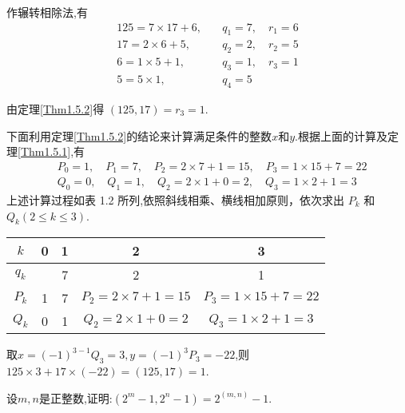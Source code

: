 \proof 作辗转相除法,有
\begin{equation*}
	\begin{aligned}
		125=7 \times 17+6, \quad& q_{1}=7, \quad r_{1}=6 \\
		17=2 \times 6+5, \quad& q_{2}=2, \quad r_{2}=5 \\
		6=1 \times 5+1, \quad& q_{3}=1, \quad r_{3}=1 \\
		5=5 \times 1, \quad&q_{4}=5
	\end{aligned}
\end{equation*}

由定理\ref{Thm1.5.2}得 $(125,17)=r_{3}=1$.

下面利用定理\ref{Thm1.5.2}的结论来计算满足条件的整数$x$和$y$.根据上面的计算及定理\ref{Thm1.5.1},有
\begin{equation*}
	\begin{aligned}
		&P_{0}=1, \quad P_{1}=7, \quad P_{2}=2 \times 7+1=15, \quad P_{3}=1 \times 15+7=22 \\
		&Q_{0}=0, \quad Q_{1}=1, \quad Q_{2}=2 \times 1+0=2, \quad Q_{3}=1 \times 2+1=3
	\end{aligned}
\end{equation*}
上述计算过程如表 1.2 所列,依照斜线相乘、横线相加原则，依次求出 $P_{k}$ 和 $Q_{k}(2 \leqslant k \leqslant 3)$.

\begin{center}
	\begin{tabular}{|c|c|c|c|c|}
		\hline$k$ & 0 & 1 & 2 & 3 \\
		\hline$q_{k}$ & & 7 & 2 & 1 \\
		\hline$P_{k}$ & 1 & 7 & $P_{2}=2 \times 7+1=15$ & $P_{3}=1 \times 15+7=22$ \\
		\hline$Q_{k}$ & 0 & 1 & $Q_{2}=2 \times 1+0=2$ & $Q_{3}=1 \times 2+1=3$ \\
		\hline
	\end{tabular}
\end{center}

取$x=(-1)^{3-1} Q_{3}=3, y=(-1)^{3} P_{3}=-22$,则$125 \times 3+17 \times(-22)=(125,17)=1$.

\example 设$m, n$是正整数,证明:$\left(2^{m}-1,2^{n}-1\right)=2^{(m, n)}-1$.

